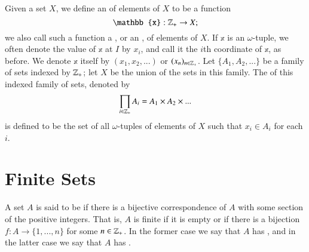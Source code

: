    \begin{definition}
        Given a set $X$, we define an  of elements of $X$ to be a function \begin{equation*}
            \mathbb{x}:\Z_+\rightarrow X;
        \end{equation*}
        we also call such a function a , or an , of elements of $X$. If $\mathbb{x}$ is an $\omega$-tuple, we often denote the value of $\mathbb{x}$ at $I$ by $x_i$, and call it the $i$th coordinate of $\mathbb{x}$, as before. We denote $\mathbb{x}$ itself by $(x_1,x_2,...)$ or $(x_n)_{n\in\mathbb Z_+}$. Let $\{A_1,A_2,...\}$ be a family of sets indexed by $\mathbb Z_+$; let $X$ be the union of the sets in this family. The  of this indexed family of sets, denoted by \begin{equation*}
            \prod\limits_{i\in\mathbb Z_+}A_i = A_1\times A_2 \times ...
        \end{equation*}
        is defined to be the set of all $\omega$-tuples of elements of $X$ such that $x_i \in A_i$ for each $i$.
    \end{definition}

    \section{Finite Sets}

    \begin{definition}
        A set $A$ is said to be  if there is a bijective correspondence of $A$ with some section of the positive integers. That is, $A$ is finite if it is empty or if there is a bijection $f:A\rightarrow \{1,...,n\}$ for some $n \in \mathbb Z_+$. In the former case we say that $A$ has , and in the latter case we say that $A$ has .
    \end{definition}

